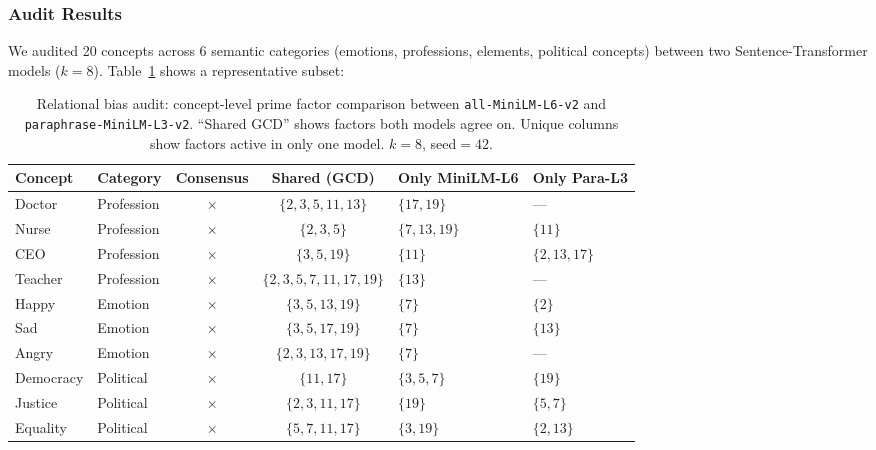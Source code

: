 \documentclass[10pt]{article}
\begin{document}
\subsubsection{Audit Results}

We audited 20 concepts across 6 semantic categories (emotions, professions, elements, political concepts) between two Sentence-Transformer models ($k\!=\!8$). Table~\ref{tab:audit} shows a representative subset:

\begin{table}[t]
\centering
\caption{Relational bias audit: concept-level prime factor comparison between \texttt{all-MiniLM-L6-v2} and \texttt{paraphrase-MiniLM-L3-v2}. ``Shared GCD'' shows factors both models agree on. Unique columns show factors active in only one model. $k=8$, seed$=42$.}
\label{tab:audit}
\begin{tabular}{llccll}
\toprule
Concept & Category & Consensus & Shared (GCD) & Only MiniLM-L6 & Only Para-L3 \\
\midrule
Doctor    & Profession & $\times$ & $\{2,3,5,11,13\}$ & $\{17,19\}$ & --- \\
Nurse     & Profession & $\times$ & $\{2,3,5\}$       & $\{7,13,19\}$ & $\{11\}$ \\
CEO       & Profession & $\times$ & $\{3,5,19\}$      & $\{11\}$     & $\{2,13,17\}$ \\
Teacher   & Profession & $\times$ & $\{2,3,5,7,11,17,19\}$ & $\{13\}$ & --- \\
\midrule
Happy     & Emotion    & $\times$ & $\{3,5,13,19\}$   & $\{7\}$      & $\{2\}$ \\
Sad       & Emotion    & $\times$ & $\{3,5,17,19\}$   & $\{7\}$      & $\{13\}$ \\
Angry     & Emotion    & $\times$ & $\{2,3,13,17,19\}$ & $\{7\}$    & --- \\
\midrule
Democracy & Political  & $\times$ & $\{11,17\}$       & $\{3,5,7\}$  & $\{19\}$ \\
Justice   & Political  & $\times$ & $\{2,3,11,17\}$   & $\{19\}$     & $\{5,7\}$ \\
Equality  & Political  & $\times$ & $\{5,7,11,17\}$   & $\{3,19\}$   & $\{2,13\}$ \\
\bottomrule
\end{tabular}
\end{table}
\end{document}
